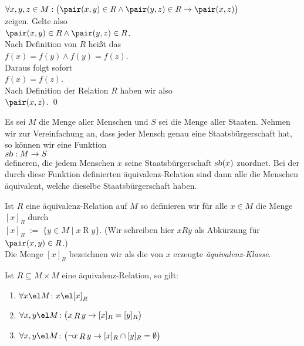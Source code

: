 \begin{enumerate}
      $\forall x,y,z \in M: \bigl(\pair(x,y) \in R \wedge \pair(y,z) \in R \rightarrow \pair(x,z)\bigr)$
      \\[0.2cm]
      zeigen.  Gelte also 
      \\[0.2cm]
      \hspace*{1.3cm}
      $\pair(x,y) \in R \wedge \pair(y,z) \in R$.
      \\[0.2cm]
      Nach Definition von $R$ heißt das 
      \\[0.2cm]
      \hspace*{1.3cm}
      $f(x) = f(y) \wedge f(y) = f(z)$.
      \\[0.2cm]
      Daraus folgt sofort 
      \\[0.2cm]
      \hspace*{1.3cm}
      $f(x) = f(z)$.
      \\[0.2cm]
      Nach Definition der Relation $R$ haben wir also 
      \\[0.2cm]
      \hspace*{1.3cm}
      $\pair(x,z)$.  \qed
\end{enumerate}

\example
Es sei $M$ die Menge aller Menschen und $S$ sei die Menge aller Staaten.  Nehmen wir zur
Vereinfachung an, dass jeder Mensch genau eine Staatsb\"{u}rgerschaft hat, so k\"{o}nnen wir eine Funktion
\\[0.2cm]
\hspace*{1.3cm}
$\textsl{sb}: M \rightarrow S$
\\[0.2cm]
defineren, die jedem Menschen $x$ seine Staatsb\"{u}rgerschaft $\textsl{sb}(x)$ zuordnet.  Bei der durch
diese Funktion definierten \"{a}quivalenz-Relation sind dann alle die Menschen \"{a}quivalent, welche dieselbe
Staatsb\"{u}rgerschaft haben.  


\begin{Definition}
Ist $R$ eine \"{a}quivalenz-Relation auf $M$ so definieren wir f\"{u}r alle $x \in M$ 
die Menge $[x]_R$ durch \\[0.2cm]
\hspace*{1.3cm} $[x]_R \;:=\; \bigl\{ y \in M \mid x \mathop{R} y \bigr\}$. \qquad
(Wir schreiben hier $x R y$ als Abk\"{u}rzung f\"{u}r $\pair(x, y) \in R$.) 
\\[0.2cm]
Die Menge $[x]_R$ bezeichnen wir als die von $x$ erzeugte \emph{\"{a}quivalenz-Klasse}.  
\end{Definition}

\begin{Satz} 
Ist $R \subseteq M \times M$ eine \"{a}quivalenz-Relation, so gilt: 
\begin{enumerate}
\item $\forall x \el M \colon x \el [x]_R$
\item $\forall x, y \el M \colon \bigl(x \mathop{R} y \rightarrow [x]_R = [y]_R\bigr)$
\item $\forall x, y \el M \colon \bigl(\neg x \mathop{R} y \rightarrow [x]_R \cap [y]_R = \emptyset\bigr)$
\end{enumerate}
\end{Satz}

